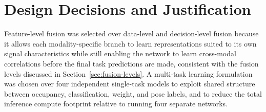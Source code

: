\section{Design Decisions and Justification}
\label{sec:design-decisions}
Feature-level fusion was selected over data-level and decision-level
fusion because it allows each modality-specific branch to learn
representations suited to its own signal characteristics while still
enabling the network to learn cross-modal correlations before the final
task predictions are made, consistent with the fusion levels discussed in
Section~\ref{sec:fusion-levels}. A multi-task learning formulation was
chosen over four independent single-task models to exploit shared
structure between occupancy, classification, weight, and pose labels, and
to reduce the total inference compute footprint relative to running four
separate networks.



